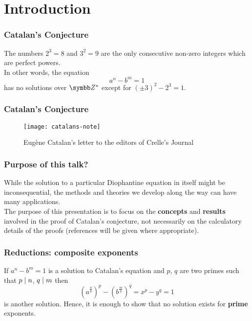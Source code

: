 \section{Introduction}

\begin{frame}
\frametitle{Catalan's Conjecture}

The numbers \(2^3 = 8\) and \(3^2 = 9\) are the only consecutive non-zero integers which are perfect powers. \\[1em]

In other words, the equation
\[
    a^n - b^m = 1
\]
has no solutions over \(\integers^*\) except for \((\pm 3)^2 - 2^3 = 1\).
\end{frame}

\begin{frame}
\frametitle{Catalan's Conjecture}

\begin{figure}
    \centering
    \texttt{[image: catalans-note]}
    \caption*{Eugène Catalan's letter to the editors of Crelle's Journal \cite{Catalan1844_Note}}
\end{figure}
\end{frame}

\begin{frame}
\frametitle{Purpose of this talk?}

While the solution to a particular Diophantine equation in itself might be inconsequential, the methods and theories we develop along the way can have many applications. \\[1em]

The purpose of this presentation is to focus on the \textbf{concepts} and \textbf{results} involved in the proof of Catalan's conjecture, not necessarily on the calculatory details of the proofs (references will be given where appropriate).
\end{frame}




\begin{frame}
\frametitle{Reductions: composite exponents}

If \(a^n - b^m = 1\) is a solution to Catalan's equation and \(p\), \(q\) are two primes such that \(p \mid n\), \(q \mid m\) then
\[
    \left(a^{\frac{n}{p}}\right)^p - \left(b^{\frac{m}{q}}\right)^q = x^p - y^q = 1
\]
is another solution. Hence, it is enough to show that no solution exists for \textbf{prime} exponents.
\end{frame}

